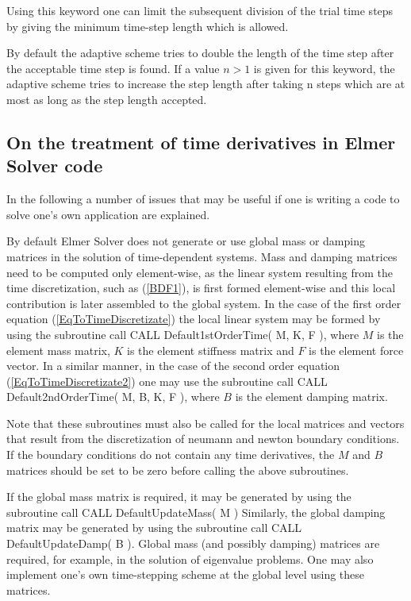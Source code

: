 Using this keyword one can limit the subsequent division of the trial time steps 
by giving the minimum time-step length which is allowed.

By default the adaptive scheme tries to double the length of the time step 
after the acceptable time step is found. If a value $n>1$ is given for this keyword,
the adaptive scheme tries to increase the step length after taking n steps which are at 
most as long as the step length accepted.
\sifend

\begin{versiona}

\section{On the treatment of time derivatives in Elmer Solver code}

In the following a number of issues that may be useful if one is writing a code
to solve one's own application are explained. 

By default Elmer Solver does not 
generate or use global mass or damping matrices in the solution of time-dependent 
systems. Mass and damping matrices need to be computed only element-wise, as  
the linear system resulting from the time discretization, such as (\ref{BDF1}),
is first formed element-wise and this local contribution is later assembled to the
global system. In the case of the first order equation (\ref{EqToTimeDiscretizate}) 
the local linear system may be formed by using the subroutine call
\ttbegin
 CALL Default1stOrderTime( M, K, F ),
\ttend
where $M$ is the element mass matrix, $K$ is the element stiffness matrix 
and $F$ is the element force vector. In a similar manner,
in the case of the second order equation (\ref{EqToTimeDiscretizate2}) 
one may use the subroutine call
\ttbegin
 CALL Default2ndOrderTime( M, B, K, F ),
\ttend
where $B$ is the element damping matrix.

Note that these subroutines must also be called for the local matrices and vectors
that result from the discretization of neumann and newton boundary
conditions. If the boundary conditions do not contain any time derivatives,
the $M$ and $B$ matrices should be set to be zero before calling the above subroutines.

If the global mass matrix is required, it may be generated by using the subroutine call
\ttbegin
 CALL DefaultUpdateMass( M )
\ttend
Similarly, the global damping matrix may be generated by using the subroutine call
\ttbegin
 CALL DefaultUpdateDamp( B ).
\ttend
Global mass (and possibly damping) matrices are required, for example, in the
solution of eigenvalue problems. One may also implement one's own time-stepping
scheme at the global level using these matrices.
   




\end{versiona}
